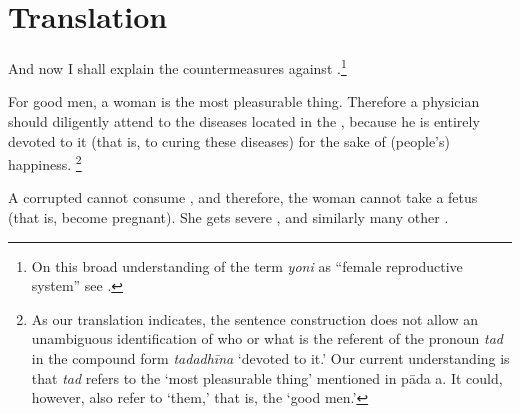    \newpage
    \section{Translation}
    
    \begin{translation}
        
        \item [1] And now I shall explain the countermeasures against
.\footnote{On this broad understanding of the term
    \emph{yoni} as “female reproductive system” see \cite[pp.\
    572--5]{das-2003}.}
            
            
            \item [*3] For good men, a woman is the most pleasurable
thing. Therefore a physician should diligently attend to
the diseases located in the , because he is entirely devoted to it (that is, to
curing these diseases) for the sake of (people's)
happiness.%
\footnote{%
    As our translation indicates, the sentence
    construction does not allow an unambiguous
    identification of who or what is the referent of the
    pronoun \emph{tad} in the compound form
    \emph{tadadhīna} ‘devoted to it.’ Our current
    understanding is that \emph{tad} refers to the ‘most
    pleasurable thing’ mentioned in pāda a. It could,
    however, also refer to ‘them,’ that is, the ‘good
    men.’%
    }
                
                \item [*4] A corrupted  cannot 
                consume 
                , and therefore, the woman cannot take a fetus (that is, 
                become pregnant). She gets severe 
                , 
                 and similarly many other 
                \se{roga}{diseases}.
         
         
    

\end{translation}
